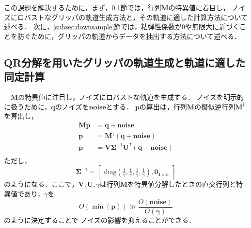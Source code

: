 \documentclass[a4paper]{jarticle}
\begin{document}
この課題を解決するために，まず，\ref{subsec:QR_traj_and_calculation}節では，行列$\mathbf{M}$の特異値に着目し，
ノイズにロバストなグリッパの軌道生成方法と，その軌道に適した計算方法について述べる．
次に，\ref{subsec:downsample}節では，粘弾性係数が0や無限大に近づくことを防ぐために，グリッパの軌道からデータを抽出する方法について述べる．
\subsection{QR分解を用いたグリッパの軌道生成と軌道に適した同定計算}\label{subsec:QR_traj_and_calculation}
　$\mathbf{M}$の特異値に注目し，ノイズにロバストな軌道を生成する．%
ノイズを明示的に扱うために，$\mathbf{q}$のノイズを$\mathbf{noise}$とする．
$\mathbf{p}$の算出は，行列$\mathbf{M}$の擬似逆行列$\mathbf{M}^{\dagger}$を算出し，
\begin{equation}
    \begin{aligned}
    \mathbf{M}\mathbf{p} &= \mathbf{q} + \mathbf{noise}\\
              \mathbf{p} &= \mathbf{M}^{\dagger}(\mathbf{q} + \mathbf{noise})\\ 
            \mathbf{p} &= \mathbf{V}\mathbf{\Sigma}^{-1}\mathbf{U}^T(\mathbf{q}+\mathbf{noise})\\
    \end{aligned}
\end{equation}
ただし，
\begin{equation}
            \mathbf{\Sigma}^{-1} =
            \begin{bmatrix}
                 \mathrm{diag}(\frac{1}{\gamma}, \frac{1}{\gamma}, \frac{1}{\gamma}, \frac{1}{\gamma}), \mathbf{0}_{4 \times n}
            \end{bmatrix}
\end{equation}
のようになる．ここで，$\mathbf{V},\mathbf{U},\gamma$は行列$\mathbf{M}$を特異値分解したときの直交行列と特異値であり，$\gamma$を
\begin{equation}
    O(\min({\mathbf{p}})) \gg \frac{O(\mathbf{noise})}{O(\mathbf{\gamma})}
    \label{eq:gamma}
\end{equation}
のように決定することで
ノイズの影響を抑えることができる．
\end{document}
